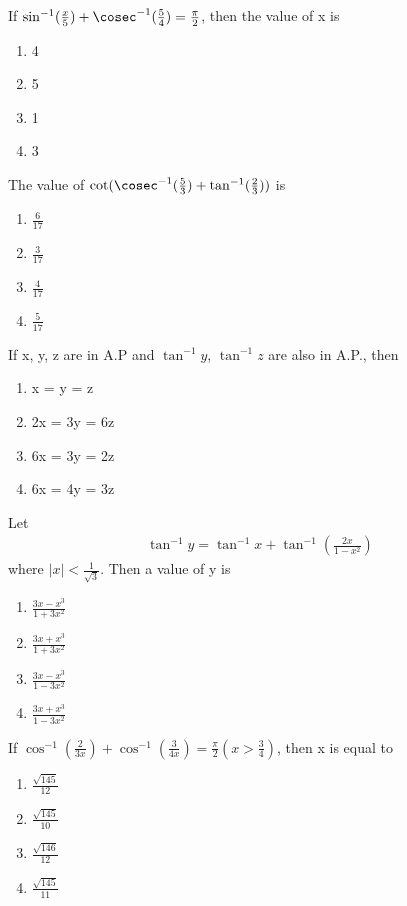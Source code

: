 \item If $\sin^{-1}(\frac{x}{5}) + \cosec^{-1}(\frac{5}{4}) = \frac{\pi}{2}$, then the value of x is
\begin{enumerate}
\item 4
\item 5
\item 1
\item 3
\end{enumerate}

\item The value of $\cot(\cosec^{-1}(\frac{5}{3}) + \tan^{-1}(\frac{2}{3}))$ is
\begin{enumerate}
\item $\frac{6}{17}$
\item $\frac{3}{17}$
\item $\frac{4}{17}$
\item $\frac{5}{17}$
\end{enumerate}

\item If x, y, z are in A.P and $\tan^{-1}y$, $\tan^{-1}z$ are also in A.P., then
\begin{enumerate}
\item x = y = z
\item 2x = 3y = 6z
\item 6x = 3y = 2z
\item 6x = 4y = 3z
\end{enumerate}

\item Let 
\begin{align*}
\tan^{-1}y = \tan^{-1}x + \tan^{-1}(\frac{2x}{1 - x^2})
\end{align*}
where $|x| < \frac{1}{\sqrt{3}}$. Then a value of y is
\begin{enumerate}
\item $\frac{3x - x^3}{1 + 3x^2}$
\item $\frac{3x + x^3}{1 + 3x^2}$
\item $\frac{3x - x^3}{1 - 3x^2}$
\item $\frac{3x + x^3}{1 - 3x^2}$
\end{enumerate}

\item If $\cos^{-1}(\frac{2}{3x}) + \cos^{-1}(\frac{3}{4x}) = \frac{\pi}{2}(x > \frac{3}{4})$, then x is equal to
\begin{enumerate}
\item $\frac{\sqrt{145}}{12}$
\item $\frac{\sqrt{145}}{10}$
\item $\frac{\sqrt{146}}{12}$
\item $\frac{\sqrt{145}}{11}$
\end{enumerate}

